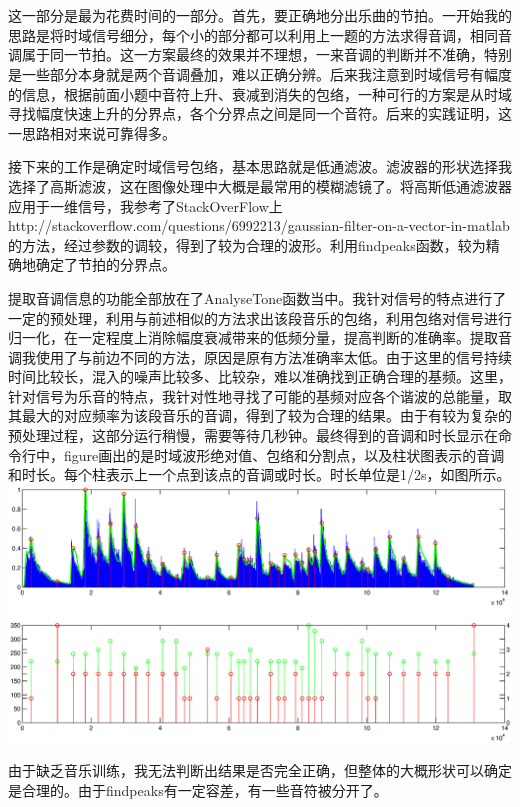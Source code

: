 \section{}
\noindent{}
\par
这一部分是最为花费时间的一部分。首先，要正确地分出乐曲的节拍。一开始我的思路是将时域信号细分，每个小的部分都可以利用上一题的方法求得音调，相同音调属于同一节拍。这一方案最终的效果并不理想，一来音调的判断并不准确，特别是一些部分本身就是两个音调叠加，难以正确分辨。后来我注意到时域信号有幅度的信息，根据前面小题中音符上升、衰减到消失的包络，一种可行的方案是从时域寻找幅度快速上升的分界点，各个分界点之间是同一个音符。后来的实践证明，这一思路相对来说可靠得多。
\par
接下来的工作是确定时域信号包络，基本思路就是低通滤波。滤波器的形状选择我选择了高斯滤波，这在图像处理中大概是最常用的模糊滤镜了。将高斯低通滤波器应用于一维信号，我参考了StackOverFlow上http://stackoverflow.com/questions/6992213/gaussian-filter-on-a-vector-in-matlab的方法，经过参数的调较，得到了较为合理的波形。利用findpeaks函数，较为精确地确定了节拍的分界点。
\par
提取音调信息的功能全部放在了AnalyseTone函数当中。我针对信号的特点进行了一定的预处理，利用与前述相似的方法求出该段音乐的包络，利用包络对信号进行归一化，在一定程度上消除幅度衰减带来的低频分量，提高判断的准确率。提取音调我使用了与前边不同的方法，原因是原有方法准确率太低。由于这里的信号持续时间比较长，混入的噪声比较多、比较杂，难以准确找到正确合理的基频。这里，针对信号为乐音的特点，我针对性地寻找了可能的基频对应各个谐波的总能量，取其最大的对应频率为该段音乐的音调，得到了较为合理的结果。由于有较为复杂的预处理过程，这部分运行稍慢，需要等待几秒钟。最终得到的音调和时长显示在命令行中，figure画出的是时域波形绝对值、包络和分割点，以及柱状图表示的音调和时长。每个柱表示上一个点到该点的音调或时长。时长单位是1/2s，如图所示。
\includegraphics[width=\textwidth]{A1_9.eps}
\par
由于缺乏音乐训练，我无法判断出结果是否完全正确，但整体的大概形状可以确定是合理的。由于findpeaks有一定容差，有一些音符被分开了。
